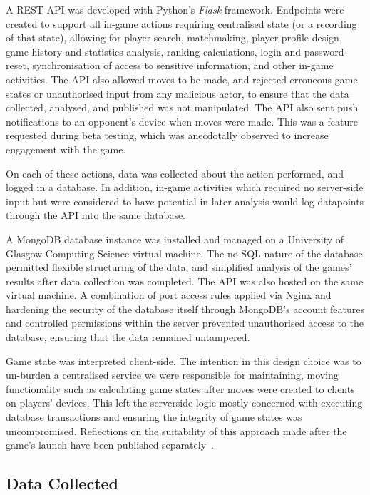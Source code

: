 A REST API was developed with Python's \emph{Flask} framework. Endpoints were
created to support all in-game actions requiring centralised state (or a
recording of that state), allowing for player search, matchmaking, player
profile design, game history and statistics analysis, ranking calculations,
login and password reset, synchronisation of access to sensitive information,
and other in-game activities. The API also allowed moves to be made, and
rejected erroneous game states or unauthorised input from any malicious actor,
to ensure that the data collected, analysed, and published was not manipulated.
The API also sent push notifications to an opponent's device when moves were
made. This was a feature requested during beta testing, which was anecdotally
observed to increase engagement with the game.

On each of these actions, data was collected about the action performed, and
logged in a database. In addition, in-game activities which required no
server-side input but were considered to have potential in later analysis would
log datapoints through the API into the same database.

A MongoDB database instance was installed and managed on a University of Glasgow
Computing Science virtual machine. The no-SQL nature of the database permitted
flexible structuring of the data, and simplified analysis of the games' results
after data collection was completed. The API was also hosted on the same virtual
machine. A combination of port access rules applied via Nginx and hardening the
security of the database itself through MongoDB's account features and
controlled permissions within the server prevented unauthorised access to the
database, ensuring that the data remained untampered.

Game state was interpreted client-side. The intention in this design choice was
to un-burden a centralised service we were responsible for maintaining, moving
functionality such as calculating game states after moves were created to
clients on players' devices. This left the serverside logic mostly concerned
with executing database transactions and ensuring the integrity of game states
was uncompromised. Reflections on the suitability of this approach made after
the game's launch have been published separately~\cite{RPGLiteLessonsLearned}.


\subsection{Data Collected}
\label{sec:rpglite_data_discussed}

